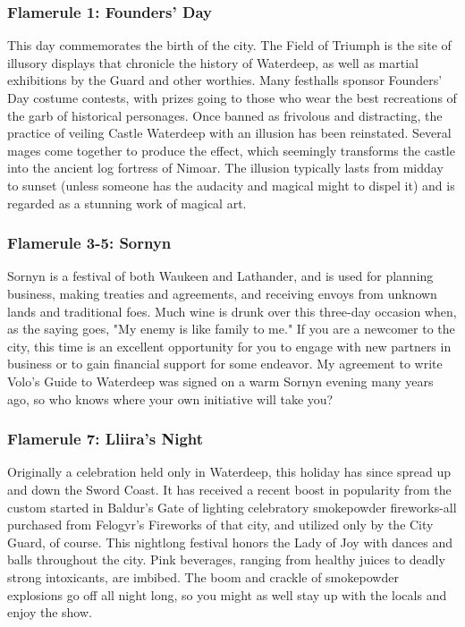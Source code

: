 \documentclass[10pt,a4paper,twoside,twocolumn,openany,nodeprecatedcode]{dndbook}
\begin{document}
\subsubsection{Flamerule 1: Founders' Day}
This day commemorates the birth of the city. The Field of Triumph is the site of illusory displays that chronicle the history of Waterdeep, as well as martial exhibitions by the Guard and other worthies. Many festhalls sponsor Founders' Day costume contests, with prizes going to those who wear the best recreations of the garb of historical personages.
Once banned as frivolous and distracting, the practice of veiling Castle Waterdeep with an illusion has been reinstated. Several mages come together to produce the effect, which seemingly transforms the castle into the ancient log fortress of Nimoar. The illusion typically lasts from midday to sunset (unless someone has the audacity and magical might to dispel it) and is regarded as a stunning work of magical art.
\subsubsection{Flamerule 3-5: Sornyn}
Sornyn is a festival of both Waukeen and Lathander, and is used for planning business, making treaties and agreements, and receiving envoys from unknown lands and traditional foes. Much wine is drunk over this three-day occasion when, as the saying goes, "My enemy is like family to me." If you are a newcomer to the city, this time is an excellent opportunity for you to engage with new partners in business or to gain financial support for some endeavor. My agreement to write Volo's Guide to Waterdeep was signed on a warm Sornyn evening many years ago, so who knows where your own initiative will take you?
\subsubsection{Flamerule 7: Lliira's Night}
Originally a celebration held only in Waterdeep, this holiday has since spread up and down the Sword Coast. It has received a recent boost in popularity from the custom started in Baldur's Gate of lighting celebratory smokepowder fireworks-all purchased from Felogyr's Fireworks of that city, and utilized only by the City Guard, of course. This nightlong festival honors the Lady of Joy with dances and balls throughout the city. Pink beverages, ranging from healthy juices to deadly strong intoxicants, are imbibed. The boom and crackle of smokepowder explosions go off all night long, so you might as well stay up with the locals and enjoy the show.
\end{document}
